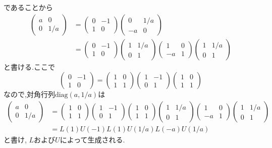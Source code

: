 であることから
\begin{align*}
  \begin{pmatrix}a&0\\0&1/a\end{pmatrix} 
  &=\begin{pmatrix}0&-1\\1&0\end{pmatrix}\begin{pmatrix}0&1/a\\-a&0\end{pmatrix}\\
  &=\begin{pmatrix}0&-1\\1&0\end{pmatrix}\begin{pmatrix}1&1/a\\0&1\end{pmatrix}
  \begin{pmatrix}1&0\\-a&1\end{pmatrix}\begin{pmatrix}1&1/a\\0&1\end{pmatrix}
\end{align*}
と書ける.ここで
\[
\begin{pmatrix}0&-1\\1&0\end{pmatrix}=\begin{pmatrix}1&0\\1&1\end{pmatrix}
\begin{pmatrix}1&-1\\0&1\end{pmatrix}\begin{pmatrix}1&0\\1&1\end{pmatrix}
\]
なので,対角行列$\mathrm{diag}(a,1/a)$は
\begin{align*}
  \begin{pmatrix}a&0\\0&1/a\end{pmatrix}
  &=\begin{pmatrix}1&0\\1&1\end{pmatrix}\begin{pmatrix}1&-1\\0&1\end{pmatrix}
  \begin{pmatrix}1&0\\1&1\end{pmatrix}\begin{pmatrix}1&1/a\\0&1\end{pmatrix}
  \begin{pmatrix}1&0\\-a&1\end{pmatrix}\begin{pmatrix}1&1/a\\0&1\end{pmatrix}\\
  &=L(1)U(-1)L(1)U(1/a)L(-a)U(1/a)
\end{align*}
と書け, $L$および$U$によって生成される. 

